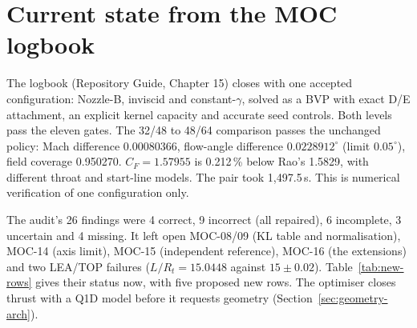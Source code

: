 \section{Current state from the MOC logbook}
\label{sec:current-state}
The logbook (Repository Guide, Chapter 15) closes with one accepted configuration:
Nozzle-B, inviscid and constant-$\gamma$, solved as a BVP with exact D/E attachment,
an explicit kernel capacity and accurate seed controls.
Both levels pass the eleven gates. The 32/48 to 48/64 comparison passes the unchanged
policy: Mach difference 0.00080366, flow-angle difference $0.0228912^\circ$ (limit
$0.05^\circ$), field coverage 0.950270. $C_F=1.57955$ is 0.212\,\% below Rao's 1.5829,
with different throat and start-line models. The pair took 1{,}497.5\,s. This is numerical verification of one configuration only.

The audit's 26 findings were 4 correct, 9 incorrect (all repaired), 6 incomplete,
3 uncertain and 4 missing. It left open MOC-08/09 (KL table and normalisation), MOC-14 (axis limit), MOC-15
(independent reference), MOC-16 (the extensions) and two LEA/TOP failures
($L/R_t=15.0448$ against $15\pm0.02$). Table~\ref{tab:new-rows} gives their status now, with five proposed new rows. The
optimiser closes thrust with a Q1D model before it requests geometry
(Section~\ref{sec:geometry-arch}).

